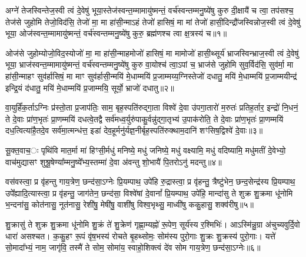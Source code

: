 \setcounter{anuvakam}{0}
अग्ने॑ तेजस्विन्तेज॒स्वी त्वं दे॒वेषु॑ भूया॒स्तेज॑स्वन्त॒म्मामायु॑ष्मन्तं॒ वर्च॑स्वन्तम्मनु॒ष्ये॑षु कुरु दी॒क्षायै॑ च त्वा॒ तप॑सश्च॒ तेज॑से जुहोमि तेजो॒विद॑सि॒ तेजो॑ मा॒ मा हा॑सी॒न्मा\-ऽहं तेजो॑ हासिषं॒ मा मां तेजो॑ हासी॒दिन्द्रौ॑जस्विन्नोज॒स्वी त्वं दे॒वेषु॑ भूया॒ ओज॑स्वन्त॒म्मामायु॑ष्मन्तं॒ वर्च॑स्वन्तम्मनु॒ष्ये॑षु कुरु॒ ब्रह्म॑णश्च त्वा क्ष॒त्रस्य॑ च॥१॥

ओज॑से जुहोम्योजो॒विद॒स्योजो॑ मा॒ मा हा॑सी॒न्माहमोजो॑ हासिषं॒ मा मामोजो॑ हासी॒थ्सूर्य॑ भ्राजस्विन्भ्राज॒स्वी त्वं दे॒वेषु॑ भूया॒ भ्राज॑स्वन्त॒म्मामायु॑ष्मन्तं॒ वर्च॑स्वन्तम्मनु॒ष्ये॑षु कुरु वा॒योश्च॑ त्वा॒\-ऽपां च॒ भ्राज॑से जुहोमि सुव॒र्विद॑सि॒ सुव॑र्मा॒ मा हा॑सी॒न्माहꣳ सुव॑र्\mbox{}हासिषं॒ मा माꣳ सुव॑र्\mbox{}हासी॒न्मयि॑ मे॒धाम्मयि॑ प्र॒जाम्मय्य॒ग्निस्तेजो॑ दधातु॒ मयि॑ मे॒धाम्मयि॑ प्र॒जाम्मयीन्द्र॑ इन्द्रि॒यं द॑धातु॒ मयि॑ मे॒धाम्मयि॑ प्र॒जाम्मयि॒ सूर्यो॒ भ्राजो॑ दधातु॥२॥

{\anuvakamend[{क्ष॒त्रस्य॑ च॒ मयि॒ त्रयो॑विꣳशतिश्च॥१॥}]}

वा॒युर्\mbox{}हिं॑क॒र्ता\-ऽग्निः प्र॑स्तो॒ता प्र॒जाप॑तिः॒ साम॒ बृह॒स्पति॑रुद्गा॒ता विश्वे॑ दे॒वा उ॑पगा॒तारो॑ म॒रुतः॑ प्रतिह॒र्तार॒ इन्द्रो॑ नि॒धनं॒ ते दे॒वाः प्रा॑ण॒भृतः॑ प्रा॒णम्मयि॑ दधत्वे॒तद्वै सर्व॑मध्व॒र्युरु॑पाकु॒र्वन्नु॑द्गा॒तृभ्य॑ उ॒पाक॑रोति॒ ते दे॒वाः प्रा॑ण॒भृतः॑ प्रा॒णम्मयि॑ दध॒त्वित्या॑है॒तदे॒व सर्व॑मा॒त्मन्ध॑त्त॒ इडा॑ देव॒हूर्मनु॑र्यज्ञ॒नीर्बृह॒स्पति॑रुक्थाम॒दानि॑ शꣳसिष॒द्विश्वे॑ दे॒वाः॥३॥

सू॒क्त॒वाच॒ः पृथि॑वि मात॒र्मा मा॑ हिꣳसी॒र्मधु॑ मनिष्ये॒ मधु॑ जनिष्ये॒ मधु॑ वक्ष्यामि॒ मधु॑ वदिष्यामि॒ मधु॑मतीं दे॒वेभ्यो॒ वाच॑मुद्यासꣳ शुश्रू॒षेण्या᳚म्मनु॒ष्ये᳚भ्य॒स्तम्मा॑ दे॒वा अ॑वन्तु शो॒भायै॑ पि॒तरो\-ऽनु॑ मदन्तु॥४॥

{\anuvakamend[{श॒ꣳ॒सि॒ष॒द्विश्वे॑ दे॒वा अ॒ष्टाविꣳ॑शतिश्च॥२॥}]}

वस॑वस्त्वा॒ प्र वृ॑हन्तु गाय॒त्रेण॒ छन्द॑सा॒\-ऽग्नेः प्रि॒यम्पाथ॒ उपे॑हि रु॒द्रास्त्वा॒ प्र वृ॑हन्तु॒ त्रैष्टु॑भेन॒ छन्द॒सेन्द्र॑स्य प्रि॒यम्पाथ॒ उपे᳚ह्यादि॒त्यास्त्वा॒ प्र वृ॑हन्तु॒ जाग॑तेन॒ छन्द॑सा॒ विश्वे॑षां दे॒वानां᳚ प्रि॒यम्पाथ॒ उपे॑हि॒ मान्दा॑सु ते शुक्र शु॒क्रमा धू॑नोमि भ॒न्दना॑सु॒ कोत॑नासु॒ नूत॑नासु॒ रेशी॑षु॒ मेषी॑षु॒ वाशी॑षु विश्व॒भृथ्सु॒ माध्वी॑षु ककु॒हासु॒ शक्व॑रीषु॥५॥

शु॒क्रासु॑ ते शुक्र शु॒क्रमा धू॑नोमि शु॒क्रं ते॑ शु॒क्रेण॑ गृह्णा॒म्यह्नो॑ रू॒पेण॒ सूर्य॑स्य र॒श्मिभिः॑। आ\-ऽस्मि॑न्नु॒ग्रा अ॑चुच्यवुर्दि॒वो धारा॑ असश्चत। क॒कु॒हꣳ रू॒पं वृ॑ष॒भस्य॑ रोचते बृ॒हथ्सोमः॒ सोम॑स्य पुरो॒गाः शु॒क्रः शु॒क्रस्य॑ पुरो॒गाः। यत्ते॑ सो॒मादा᳚भ्यं॒ नाम॒ जागृ॑वि॒ तस्मै॑ ते सोम॒ सोमा॑य॒ स्वाहो॒शिक्त्वं दे॑व सोम गाय॒त्रेण॒ छन्द॑सा॒\-ऽग्नेः॥६॥

